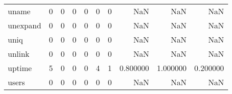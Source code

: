 \begin{tabular}{lrrrrrrrrr}
uname     &                                                  0 &                                                  0 &                                                  0 &                                                  0 &                                                  0 &                                                  0 &                                                NaN &                                    NaN &                                  NaN \\
unexpand  &                                                  0 &                                                  0 &                                                  0 &                                                  0 &                                                  0 &                                                  0 &                                                NaN &                                    NaN &                                  NaN \\
uniq      &                                                  0 &                                                  0 &                                                  0 &                                                  0 &                                                  0 &                                                  0 &                                                NaN &                                    NaN &                                  NaN \\
unlink    &                                                  0 &                                                  0 &                                                  0 &                                                  0 &                                                  0 &                                                  0 &                                                NaN &                                    NaN &                                  NaN \\
uptime    &                                                  5 &                                                  0 &                                                  0 &                                                  0 &                                                  4 &                                                  1 &                                           0.800000 &                               1.000000 &                             0.200000 \\
users     &                                                  0 &                                                  0 &                                                  0 &                                                  0 &                                                  0 &                                                  0 &                                                NaN &                                    NaN &                                  NaN \\

\end{tabular}
